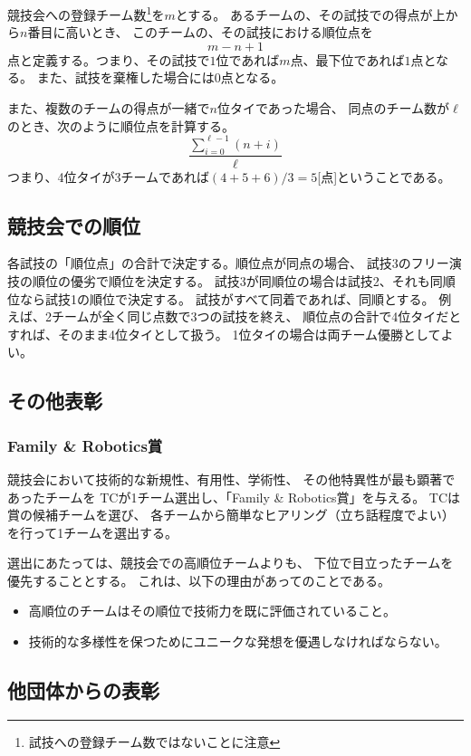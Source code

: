 \documentclass[a4j]{jarticle}
\begin{document}
競技会への登録チーム数\footnote{試技への登録チーム数ではないことに注意}を$m$とする。
あるチームの、その試技での得点が上から$n$番目に高いとき、
このチームの、その試技における順位点を
\[
	m - n + 1
\]
点と定義する。つまり、その試技で$1$位であれば$m$点、最下位であれば$1$点となる。
また、試技を棄権した場合には$0$点となる。

また、複数のチームの得点が一緒で$n$位タイであった場合、
同点のチーム数が$\ell$のとき、次のように順位点を計算する。
\[
	\dfrac{\sum_{i=0}^{\ell-1}(n + i)}{\ell}
\]
つまり、4位タイが3チームであれば$(4+5+6)/3=5$[点]ということである。


\subsection{競技会での順位}

各試技の「順位点」の合計で決定する。順位点が同点の場合、
試技3のフリー演技の順位の優劣で順位を決定する。
試技3が同順位の場合は試技2、それも同順位なら試技1の順位で決定する。
試技がすべて同着であれば、同順とする。
例えば、2チームが全く同じ点数で3つの試技を終え、
順位点の合計で4位タイだとすれば、そのまま4位タイとして扱う。
1位タイの場合は両チーム優勝としてよい。


\subsection{その他表彰}

\subsubsection{Family \& Robotics賞}

競技会において技術的な新規性、有用性、学術性、
その他特異性が最も顕著であったチームを
TCが1チーム選出し、「Family \& Robotics賞」を与える。
TCは賞の候補チームを選び、
各チームから簡単なヒアリング（立ち話程度でよい）
を行って1チームを選出する。

選出にあたっては、競技会での高順位チームよりも、
下位で目立ったチームを優先することとする。
これは、以下の理由があってのことである。
\begin{itemize}
	\item 高順位のチームはその順位で技術力を既に評価されていること。
	\item 技術的な多様性を保つためにユニークな発想を優遇しなければならない。
\end{itemize}

\subsection{他団体からの表彰}
\end{document}
